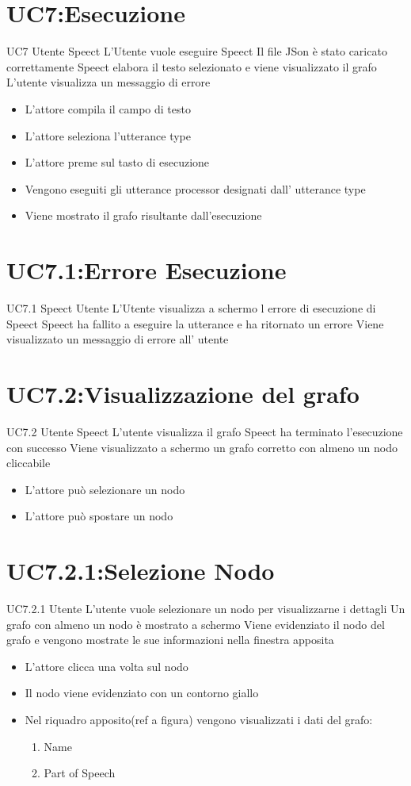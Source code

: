 \documentclass[../AnalisideiRequisiti.tex]{subfiles}
\begin{document}
\section{UC7:Esecuzione}
\UserCase
{UC7}
{Utente}
{Speect}
{L'Utente vuole eseguire Speect}
{Il file JSon è stato caricato correttamente}
{Speect elabora il testo selezionato e viene visualizzato il grafo}
{L'utente visualizza un messaggio di errore }
{\begin{itemize}
		\item{} L'attore compila il campo di testo
		\item{} L'attore seleziona l'utterance type
		\item{} L'attore preme sul tasto di esecuzione
		\item{} Vengono eseguiti gli utterance processor designati dall' utterance type
		\item{} Viene mostrato il grafo risultante dall'esecuzione
	\end{itemize}
}

\section{UC7.1:Errore Esecuzione}
\UserCase
{UC7.1}
{Speect}
{Utente}
{L'Utente visualizza a schermo l errore di esecuzione di Speect }
{Speect ha fallito a eseguire la utterance e ha ritornato un errore}
{Viene visualizzato un messaggio di errore all' utente}
{}
{}
\section{UC7.2:Visualizzazione del grafo}
\UserCase
{UC7.2}
{Utente}
{Speect}
{L'utente visualizza il grafo}
{Speect ha terminato l'esecuzione con successo}
{Viene visualizzato a schermo un grafo corretto con almeno un nodo cliccabile}
{}
{
	\begin{itemize}
		\item{} L'attore può selezionare un nodo 
		\item{} L'attore può spostare un nodo 
	\end{itemize}
}
\section{UC7.2.1:Selezione Nodo}
\UserCase
{UC7.2.1}
{Utente}
{}
{L'utente vuole selezionare un nodo per visualizzarne i dettagli}
{Un grafo con almeno un nodo è mostrato a schermo}
{Viene evidenziato il nodo del grafo e vengono mostrate le sue informazioni nella finestra apposita}
{}
{
	\begin{itemize}
		\item{} L'attore clicca una volta sul nodo
		\item{} Il nodo viene evidenziato con un contorno giallo
		\item{} Nel riquadro apposito(ref a figura) vengono visualizzati i dati del grafo:
		\begin{enumerate}
			\item{} Name
			\item{} Part of Speech
		\end{enumerate}
	\end{itemize}
}
\end{document}
